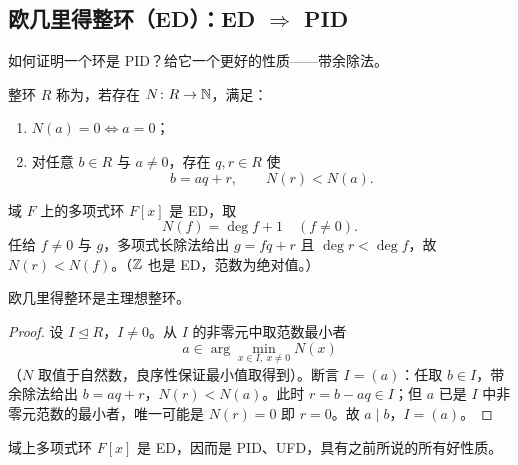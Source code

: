 \subsection{欧几里得整环（ED）：ED \texorpdfstring{$\Rightarrow$}{=>} PID}

如何证明一个环是 PID？给它一个更好的性质——带余除法。

\begin{definition}
整环 $R$ 称为，若存在
$N\colon R\to\mathbb{N}$，满足：
\begin{enumerate}[leftmargin=1.6em,itemsep=2pt]
  \item $N(a) = 0 \iff a = 0$；
  \item {}对任意 $b\in R$ 与 $a\ne 0$，存在 $q, r\in R$
        使
        \[
          b = aq + r, \qquad N(r) < N(a).
        \]
\end{enumerate}
\end{definition}

\begin{example}[最重要的例子]
域 $F$ 上的多项式环 $F[x]$ 是 ED，取
\[
  N(f) = \deg f + 1 \quad (f\ne 0).
\]
任给 $f\ne 0$ 与 $g$，多项式长除法给出 $g = fq + r$ 且
$\deg r < \deg f$，故 $N(r) < N(f)$。（$\mathbb{Z}$ 也是 ED，范数为绝对值。）
\end{example}

\begin{theorem}
欧几里得整环是主理想整环。
\end{theorem}

\begin{proof}
设 $I\trianglelefteq R$，$I\ne 0$。从 $I$ 的非零元中取范数最小者
\[
  a \in \arg\min_{x\in I,\ x\ne 0} N(x)
\]
（$N$ 取值于自然数，良序性保证最小值取得到）。断言 $I = (a)$：任取
$b\in I$，带余除法给出 $b = aq + r$，$N(r) < N(a)$。此时
$r = b - aq\in I$；但 $a$ 已是 $I$ 中非零元范数的最小者，唯一可能是
$N(r) = 0$ 即 $r = 0$。故 $a\mid b$，$I = (a)$。
\end{proof}

\begin{corollary}[{$F[x]$ 集所有好性质于一身}]
域上多项式环 $F[x]$ 是 ED，因而是 PID、UFD，具有之前所说的所有好性质。
\end{corollary}
